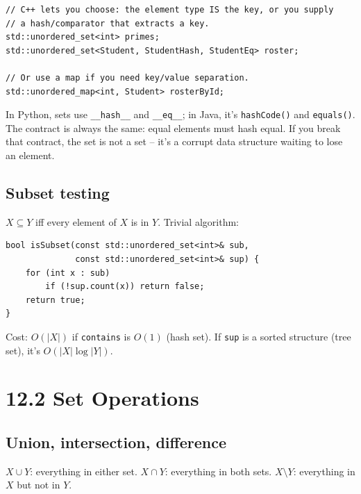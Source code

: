 \documentclass[11pt]{article}
\begin{document}
\begin{lstlisting}[basicstyle=\ttfamily\small,frame=single]
// C++ lets you choose: the element type IS the key, or you supply
// a hash/comparator that extracts a key.
std::unordered_set<int> primes;
std::unordered_set<Student, StudentHash, StudentEq> roster;

// Or use a map if you need key/value separation.
std::unordered_map<int, Student> rosterById;
\end{lstlisting}

\begin{notebox}
In Python, sets use \texttt{\_\_hash\_\_} and \texttt{\_\_eq\_\_}; in Java, it's \texttt{hashCode()} and \texttt{equals()}. The contract is always the same: equal elements must hash equal. If you break that contract, the set is not a set -- it's a corrupt data structure waiting to lose an element.
\end{notebox}

\subsection*{Subset testing}

$X \subseteq Y$ iff every element of $X$ is in $Y$. Trivial algorithm:

\begin{lstlisting}[basicstyle=\ttfamily\small,frame=single]
bool isSubset(const std::unordered_set<int>& sub,
              const std::unordered_set<int>& sup) {
    for (int x : sub)
        if (!sup.count(x)) return false;
    return true;
}
\end{lstlisting}

Cost: $O(|X|)$ if \texttt{contains} is $O(1)$ (hash set). If \texttt{sup} is a sorted structure (tree set), it's $O(|X| \log |Y|)$.

\section{12.2 Set Operations}

\subsection*{Union, intersection, difference}

\begin{defnbox}
$X \cup Y$: everything in either set.
$X \cap Y$: everything in both sets.
$X \setminus Y$: everything in $X$ but not in $Y$.
\end{defnbox}
\end{document}
